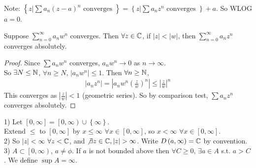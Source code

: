 \documentclass[a4paper]{article}
\begin{document}
Note: $\left\{z|\sum a_n\left(z-a\right)^n \text{  converges  }\right\} = \left\{z|\sum a_n z^n \text{  converges  }\right\} + a$. So WLOG $a=0$.

\begin{thm}
Suppose $\sum_{n=0}^\infty a_n w^n$ converges. Then $\forall z\in\mathbb{C}$, if $|z| < |w|$, then $\sum_{n=0}^\infty a_n z^n$ converges absolutely.
\begin{proof}
Since $\sum a_n w^n$ converges, $a_n w^n \to 0$ as $n\to \infty$.\\
So $\exists N \leq \mathbb{N}$, $\forall n \geq N$, $|a_n w^n| \leq 1$. Then $\forall n\geq \mathbb{N}$,
\begin{equation*}
\begin{aligned}
|a_n z^n| = |a_n w^n \left(\frac{z}{w}\right)^n| \leq |\frac{z}{w}|^n
\end{aligned}
\end{equation*}
This converges as $|\frac{z}{w}|<1$ (geometric series). So by comparison test, $\sum a_n z^n$ converges absolutely.
\end{proof}
\end{thm}

\begin{conv}
1) Let $\left[0,\infty\right] = \left[0,\infty\right) \cup \left\{ \infty\right\}$.\\
Extend $\leq$ to $\left[0,\infty\right]$ by $x\leq \infty$ $\forall x\in\left[0,\infty\right]$, so $x<\infty$ $\forall x\in\left[0,\infty\right]$.\\
2) So $|z|<\infty$ $\forall z<\mathbb{C}$, and $\not\exists z\in\C, |z|>\infty$. Write $D\left(a,\infty\right) = \mathbb{C}$ by convention.\\
3) $A\subset\left[0,\infty\right)$, $a\neq \phi$. If $a$ is not bounded above then $\forall C \geq 0$, $\exists a\in A$ s.t. $a>C$. We define $\sup A = \infty$.
\end{conv}
\end{document}

